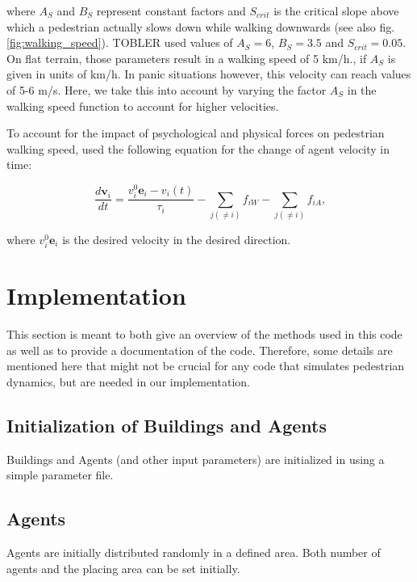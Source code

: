 \documentclass[11pt]{article}
\begin{document}
where $A_S$ and $B_{S}$ represent constant factors and $S_{crit}$ is the critical slope above which a pedestrian actually slows down while walking downwards (see also fig.\ref{fig:walking_speed}). TOBLER used values of $A_S = 6$, $B_S = 3.5$ and $S_{crit} = 0.05$. On flat terrain, those parameters result in a walking speed of 5 km/h., if $A_S$ is given in units of km/h. In panic situations however, this velocity can reach values of 5-6 m/s. Here, we take this into account by varying the factor $A_S$ in the walking speed function to account for higher velocities.

To account for the impact of psychological and physical forces on pedestrian walking speed, \citet{Helbing2000} used the following equation for the change of agent velocity in time:

\begin{equation}
	\frac{d \mathbf{v}_i}{dt} = \frac{v_i^0\mathbf{e}_i - v_i(t)}{\tau_i} - \sum_{j(\ne i)}f_{iW} - \sum_{j(\ne i)}f_{iA}\mbox{,}
\end{equation}

where $v_i^0\mathbf{e}_i$ is the desired velocity in the desired direction.






\section{Implementation}\label{sec:implementation}

This section is meant to both give an overview of the methods used in this code as well as to provide a documentation of the code. Therefore, some details are mentioned here that might not be crucial for any code that simulates pedestrian dynamics, but are needed in our implementation. 

\subsection{Initialization of Buildings and Agents}

Buildings and Agents (and other input parameters) are initialized in using a simple parameter file. 

\subsection{Agents}

Agents are initially distributed randomly in a defined area. Both number of agents and the placing area can be set initially.
\end{document}
